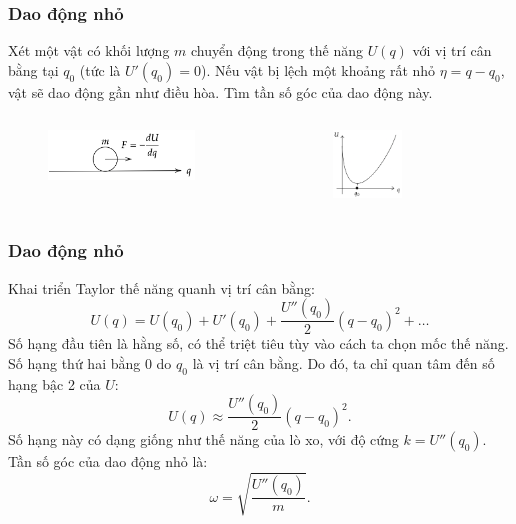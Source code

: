 \begin{frame}
\frametitle{Dao động nhỏ}
Xét một vật có khối lượng \(m\) chuyển động trong thế năng \(U(q)\) với vị trí cân bằng tại \(q_0\) (tức là \(U'(q_0)=0\)). Nếu vật bị lệch một khoảng rất nhỏ \(\eta=q-q_0\), vật sẽ dao động gần như điều hòa. Tìm tần số góc của dao động này.
\begin{columns}
\begin{column}{0.5\textwidth}
\begin{figure}
    \centering
    \includegraphics[width=0.8\textwidth]{Content/Figure/small oscillation.png}
\end{figure}
\end{column}
\begin{column}{0.5\textwidth}
\begin{figure}
    \centering
    \includegraphics[width=0.5\textwidth]{Content/Figure/DaoDongNho.png}
\end{figure}
\end{column}
\end{columns}
\end{frame}

\begin{frame}
    \frametitle{Dao động nhỏ}   
    Khai triển Taylor thế năng quanh vị trí cân bằng:
    \begin{equation*}
        U(q)=U(q_0)+U'(q_0)+\frac{U''(q_0)}{2}(q-q_0)^2+\ldots
    \end{equation*}
    Số hạng đầu tiên là hằng số, có thể triệt tiêu tùy vào cách ta chọn mốc thế năng. Số hạng thứ hai bằng 0 do \(q_0\) là vị trí cân bằng. Do đó, ta chỉ quan tâm đến số hạng bậc 2 của \(U\):
    \begin{equation*}
        U(q)\approx \frac{U''(q_0)}{2}(q-q_0)^2.
    \end{equation*}
    Số hạng này có dạng giống như thế năng của lò xo, với độ cứng \(k=U''(q_0)\). Tần số góc của dao động nhỏ là:
    \begin{equation}
        \omega=\sqrt{\frac{U''(q_0)}{m}}.
    \end{equation}
\end{frame}

